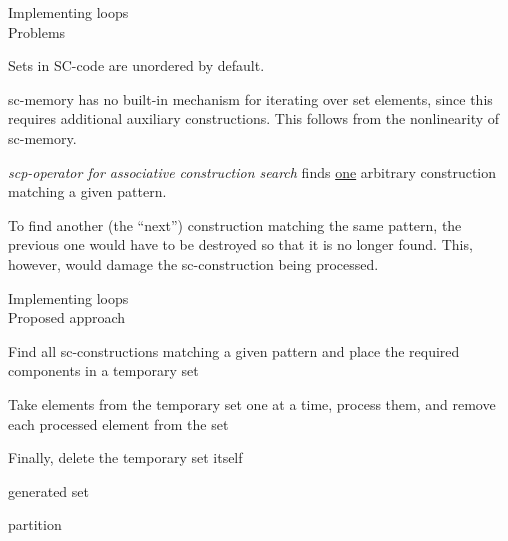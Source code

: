 \begin{frame}{Implementing loops\\Problems}
	\topline
	\RaggedRight

	\begin{textitemize}
		\item Sets in SC-code are unordered by default.
		\item sc-memory has no built-in mechanism for iterating over set elements, since this requires additional auxiliary constructions. This follows from the nonlinearity of sc-memory.
		\item \textit{scp-operator for associative construction search} finds \underline{one} arbitrary construction matching a given pattern.
		\item To find another (the ``next'') construction matching the same pattern, the previous one would have to be destroyed so that it is no longer found. This, however, would damage the sc-construction being processed.
	\end{textitemize}

\end{frame}

\begin{frame}{Implementing loops\\Proposed approach}
	\topline
	\RaggedRight

	\begin{textitemize}
		\item Find all sc-constructions matching a given pattern and place the required components in a temporary set
		\item Take elements from the temporary set one at a time, process them, and remove each processed element from the set
		\item Finally, delete the temporary set itself
	\end{textitemize}

\end{frame}

\begin{frame}{generated set\scnrolesign}
	\topline
	\RaggedRight

	\begin{SCn}


			\begin{scnindent}
				\begin{scnrelfromset}{partition}
				\end{scnrelfromset}
			\end{scnindent}

	\end{SCn}
\end{frame}


